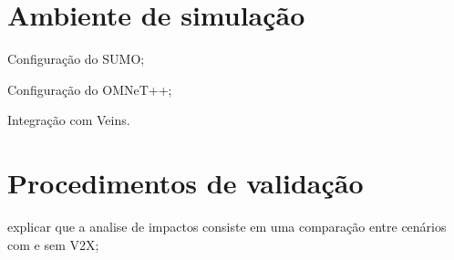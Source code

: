 \section{Ambiente de simulação}
\begin{alineas}
    \item Configuração do SUMO;
    \item Configuração do OMNeT++;
    \item Integração com Veins.
\end{alineas}

\section{Procedimentos de validação}
\begin{alineas}
    \item explicar que a analise de impactos consiste em uma comparação entre cenários com e sem V2X;
\end{alineas}